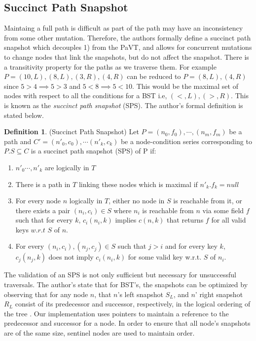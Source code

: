 \documentclass[conference]{IEEEtran}
\theoremstyle{definition}
\newtheorem{definition}{Definition}[section]
\theoremstyle{theorem}
\begin{document}
\subsection{Succinct Path Snapshot}
Maintaing a full path is difficult as part of the path may have an inconsistency from some other mutation. Therefore, the authors formally define a succinct path snapshot which decouples 1) from the PaVT, and allows for concurrent mutations to change nodes that link the snapshots, but do not affect the snapshot. There is a transitivity property for the paths as we traverse them. For example $P=(10,L),(8,L),(3,R),(4,R)$  can be reduced to $P=(8,L),(4,R)$ since $5>4 \implies 5 > 3$  and $5<8 \implies 5<10$. This would be the maximal set of nodes with respect to all the conditions for a BST i.e, $(<,L), (>, R)$. This is known as the \textit{succinct path snapshot} (SPS). The author's formal definition is stated below.
\theoremstyle{definition}
\begin{definition}{(Succinct Path Snapshot)} Let $P = (n_0, f_0),\cdots,(n_m, f_m)$ be a path and $C'=(n'_0, c_0),\cdots (n'_k, c_k)$ be a node-condition series corresponding to $P.S\subseteq C$ is a succinct path snapshot (SPS) of P if:
\begin{enumerate}
	\item $n'_0\cdots, n'_k$ are logically in $T$
	\item There is a path in $T$ linking these nodes which is maximal if $n'_k.f_k = null$
	\item For every node $n$ logically in $T$, either no node in $S$ is reachable from it, or there exists a pair $(n_i, c_i) \in S$ where $n_i$ is reachable from $n$ via some field $f$ such that for every $k$, $c_i(n_i, k)$ implies $c(n, k)$ that returns $f$ for all valid keys $w.r.t$ $S$ of $n$.
	\item For every $(n_i, c_i), (n_j, c_j) \in S$ such that $j > i$ and for every key $k$, $c_j(n_j, k)$ does not imply $c_i(n_i, k)$ for some valid key w.r.t. $S$ of $n_i$.
\end{enumerate}
\end{definition}
The validation of an SPS is not only sufficient but necessary for unsuccessful traversals. The author's state that for BST's, the snapshots can be optimized by observing that for any node $n$, that $n$'s left snapshot $S_L$, and $n$' right snapshot $R_L$ consist of its predecessor and successor, respectively,  in the logical ordering of the tree \cite{draschler-lo}. Our implementation uses pointers to maintain a reference to the predecessor and successor for a node. In order to ensure that all node's snapshots are of the same size, sentinel nodes are used to maintain order.
\end{document}
